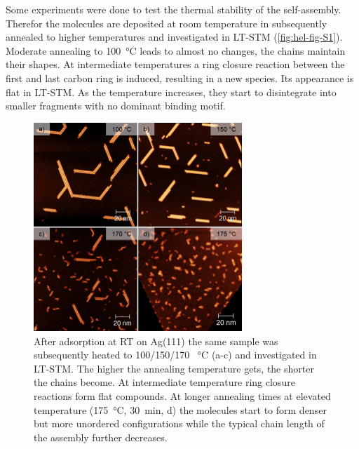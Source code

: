 \label{appendix:helicene}
Some experiments were done to test the thermal stability of the self-assembly. Therefor the molecules are deposited at room temperature in subsequently annealed to higher temperatures and investigated in LT-STM (\autoref{fig:hel-fig-S1}). Moderate annealing to \SI{100}{\celsius} leads to almost no changes, the chains maintain their shapes. At intermediate temperatures a ring closure reaction between the first and last carbon ring is induced, resulting in a new species. Its appearance is flat in LT-STM. As the temperature increases, they start to disintegrate into smaller fragments with no dominant binding motif.

\begin{figure} \centering
	\includegraphics[width=0.7\textwidth]{./images/paper/helicene/fig-S1}
	\caption{After adsorption at RT on Ag(111) the same sample was subsequently heated to 100/150/170 \SI{}{\celsius} (a-c) and investigated in LT-STM. The higher the annealing temperature gets, the shorter the chains become. At intermediate temperature ring closure reactions form flat compounds. At longer annealing times at elevated temperature (\SI{175}{\celsius}, \SI{30}{\minute}, d) the molecules start to form denser but more unordered configurations while the typical chain length of the assembly further decreases.}
	\label{fig:hel-fig-S1}
\end{figure}

